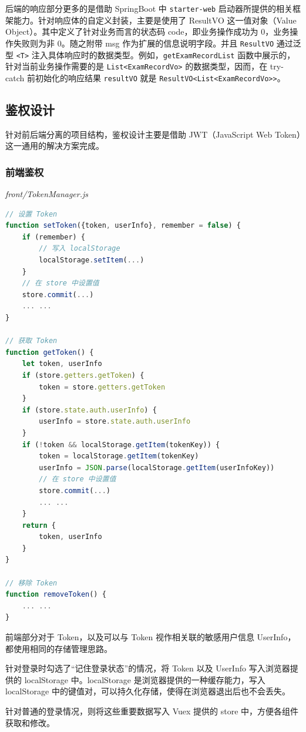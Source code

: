 后端的响应部分更多的是借助 SpringBoot 中 \lstinline!starter-web! 启动器所提供的相关框架能力。针对响应体的自定义封装，主要是使用了 ResultVO 这一值对象（Value Object）。其中定义了针对业务而言的状态码 code，即业务操作成功为 0，业务操作失败则为非 0。随之附带 msg 作为扩展的信息说明字段。并且 \lstinline!ResultVO! 通过泛型 \lstinline!<T>! 注入具体响应时的数据类型。例如，\lstinline!getExamRecordList! 函数中展示的，针对当前业务操作需要的是 \lstinline!List<ExamRecordVo>! 的数据类型，因而，在 try-catch 前初始化的响应结果 \lstinline!resultVO! 就是 \lstinline!ResultVO<List<ExamRecordVo>>!。

\subsection{鉴权设计}
针对前后端分离的项目结构，鉴权设计主要是借助 JWT（JavaScript Web Token）这一通用的解决方案完成。
\subsubsection{前端鉴权}
\noindent\textit{front/TokenManager.js}
\begin{lstlisting}[language=JavaScript]
// 设置 Token
function setToken({token, userInfo}, remember = false) {
    if (remember) {
        // 写入 localStorage
        localStorage.setItem(...)
    }
    // 在 store 中设置值
    store.commit(...)
    ... ...
}

// 获取 Token
function getToken() {
    let token, userInfo
    if (store.getters.getToken) {
        token = store.getters.getToken
    }
    if (store.state.auth.userInfo) {
        userInfo = store.state.auth.userInfo
    }
    if (!token && localStorage.getItem(tokenKey)) {
        token = localStorage.getItem(tokenKey)
        userInfo = JSON.parse(localStorage.getItem(userInfoKey))
        // 在 store 中设置值
        store.commit(...)
        ... ...
    }
    return {
        token, userInfo
    }
}

// 移除 Token
function removeToken() {
    ... ...
}
\end{lstlisting}
前端部分对于 Token，以及可以与 Token 视作相关联的敏感用户信息 UserInfo，都使用相同的存储管理思路。

针对登录时勾选了“记住登录状态”的情况，将 Token 以及 UserInfo 写入浏览器提供的 localStorage 中。localStorage 是浏览器提供的一种缓存能力，写入 localStorage 中的键值对，可以持久化存储，使得在浏览器退出后也不会丢失。

针对普通的登录情况，则将这些重要数据写入 Vuex 提供的 store 中，方便各组件获取和修改。

